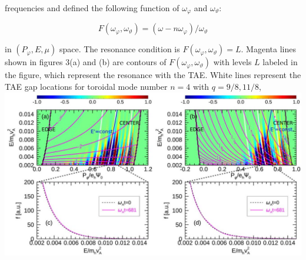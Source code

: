 \documentclass[10pt]{article}
\begin{document}
frequencies and defined the following function of $\omega_{\varphi}$ and $\omega_{\vartheta}:$

$$
F\left(\omega_{\varphi}, \omega_{\vartheta}\right)=\left(\omega-n \omega_{\varphi}\right) / \omega_{\vartheta}
$$

in $\left(P_{\varphi}, E, \mu\right)$ space. The resonance condition is $F\left(\omega_{\varphi}, \omega_{\vartheta}\right)=L$. Magenta lines shown in figures 3(a) and (b) are contours of $F\left(\omega_{\varphi}, \omega_{\vartheta}\right)$ with levels $L$ labeled in the figure, which represent the resonance with the TAE. White lines represent the TAE gap locations for toroidal mode number $n=4$ with $q=9 / 8,11 / 8$,
\includegraphics[max width=\textwidth, center]{2023_06_04_de2f4b8aa3fd859f006dg-08}
\end{document}
